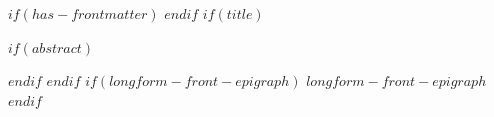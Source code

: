 $if(has-frontmatter)$
\frontmatter
$endif$
$if(title)$
\maketitle
$if(abstract)$
\begin{abstract}
$abstract$
\end{abstract}
$endif$
$endif$
$if(longform-front-epigraph)$
$longform-front-epigraph$
$endif$
